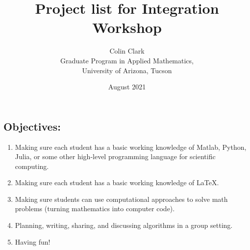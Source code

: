 \documentclass[11pt,oneside]{article}
\title{ Project list for Integration Workshop}
\author{Colin Clark \\  Graduate Program in Applied Mathematics,\\ University of Arizona, Tucson}
\date{August 2021}
\theoremstyle{definition}
\theoremstyle{definition}
\theoremstyle{remark}
\numberwithin{equation}{section}
\begin{document}
\maketitle


\subsection*{Objectives:}
\begin{enumerate}
\item Making sure each student has a basic working knowledge of Matlab, Python, Julia, or some other high-level programming language for scientific computing.
\item Making sure each student has a basic working knowledge of \LaTeX.
\item Making sure students can use computational approaches to solve math problems (turning mathematics into computer code).
\item Planning, writing, sharing, and discussing algorithms in a group setting.
\item Having fun!
\end{enumerate}

\newpage


\newpage


\newpage


\newpage


\newpage


\newpage


\newpage


\newpage


\newpage
\end{document}
